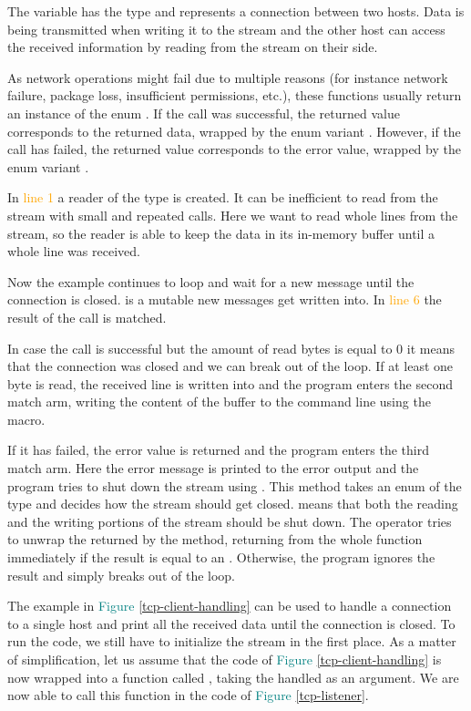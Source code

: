 The variable  has the type  and represents a connection between two hosts. Data is being
transmitted when writing it to the stream and the other host can access the received information by reading from the
stream on their side.

As network operations might fail due to multiple reasons (for instance network failure, package loss, insufficient
permissions, etc.), these functions usually return an instance of the enum . If the call was
successful, the returned value corresponds to the returned data, wrapped by the enum variant . However, if
the call has failed, the returned value corresponds to the error value, wrapped by the enum variant .

In \textcolor{orange}{line 1} a reader of the type  is created. It can be inefficient to read
from the stream with small and repeated calls. Here we want to read whole lines from the stream, so the reader is able
to keep the data in its in-memory buffer until a whole line was received.

Now the example continues to loop and wait for a new message until the connection is closed.  is a mutable
 new messages get written into. In \textcolor{orange}{line 6} the result of the call
 is matched.

In case the call is successful but the amount of read bytes is equal to 0 it means that the connection was closed and
we can break out of the loop. If at least one byte is read, the received line is written into  and the
program enters the second match arm, writing the content of the buffer to the command line using the
 macro.

If it has failed, the error value is returned and the program enters the third match arm. Here the error message is
printed to the error output and the program tries to shut down the stream using . This
method takes an enum of the type  and decides how the stream should get closed. 
means that both the reading and the writing portions of the stream should be shut down. The  operator tries to
unwrap the  returned by the method, returning from the whole function immediately if the result is equal
to an . Otherwise, the program ignores the result and simply breaks out of the loop.

The example in \textcolor{teal}{Figure \ref{tcp-client-handling}} can be used to handle a connection to a single host
and print all the received data until the connection is closed. To run the code, we still have to initialize
the stream in the first place. As a matter of simplification, let us assume that the code of
\textcolor{teal}{Figure \ref{tcp-client-handling}} is now wrapped into a function called , taking
the handled  as an argument. We are now able to call this function in the code of
\textcolor{teal}{Figure \ref{tcp-listener}}.

